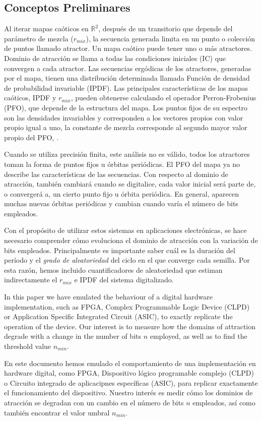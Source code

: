 \subsection{Conceptos Preliminares} \label{sec:estudio}

Al iterar mapas caóticos en $\mathbb{R} ^ 2 $, después de un transitorio que depende del parámetro de mezcla ($r_{mix}$), la secuencia generada limita en un punto o colección de puntos llamado atractor.
Un mapa caótico puede tener uno o más atractores.
Dominio de atracción se llama a todas las condiciones iniciales (IC) que convergen a cada atractor.
Las secuencias ergódicas de los atractores, generadas por el mapa, tienen una distribución determinada llamada Función de densidad de probabilidad invariable (IPDF).
Las principales características de los mapas caóticos, IPDF y $r_{mix}$, pueden obtenerse calculando el operador Perron-Frobenius (PFO), que depende de la estructura del mapa.
Los puntos fijos de su espectro son las densidades invariables y corresponden a los vectores propios con valor propio igual a uno, la constante de mezcla corresponde al segundo mayor valor propio del PFO, \cite{Lasota1994, Lasota1973}.

Cuando se utiliza precisión finita, este análisis no es válido, todos los atractores toman la forma de puntos fijos u órbitas periódicas.
El PFO del mapa ya no describe las características de las secuencias.
Con respecto al dominio de atracción, también cambiará cuando se digitalice, cada valor inicial será parte de, o convergerá a, un cierto punto fijo u órbita periódica.
En general, aparecen muchas nuevas órbitas periódicas y cambian cuando varía el número de bits empleados.

Con el propósito de utilizar estos sistemas en aplicaciones electrónicas, se hace necesario comprender cómo evoluciona el dominio de atracción con la variación de bits empleados.
Principalmente es importante saber cuál es la duración del período y el \textsl{grado de aleatoriedad} del ciclo en el que converge cada semilla.
Por esta razón, hemos incluido cuantificadores de aleatoriedad que estiman indirectamente el $r_{mix}$ e IPDF del sistema digitalizado.

In this paper we have emulated the behaviour of a digital hardware implementation, such as FPGA, Complex Programmable Logic Device (CLPD) or Application Specific Integrated Circuit (ASIC), to exactly replicate the operation of the device.
Our interest is to measure how the domains of attraction degrade with a change in the number of bits $n$ employed, as well as to find the threshold value 
$n_{min}$. 

En este documento hemos emulado el comportamiento de una implementación en hardware digital, como FPGA, Dispositivo lógico programable complejo (CLPD) o Circuito integrado de aplicacipnes específicas (ASIC), para replicar exactamente el funcionamiento del dispositivo.
Nuestro interés es medir cómo los dominios de atracción se degradan con un cambio en el número de bits $n$ empleados, así como también encontrar el valor umbral
$n_{min}$.
